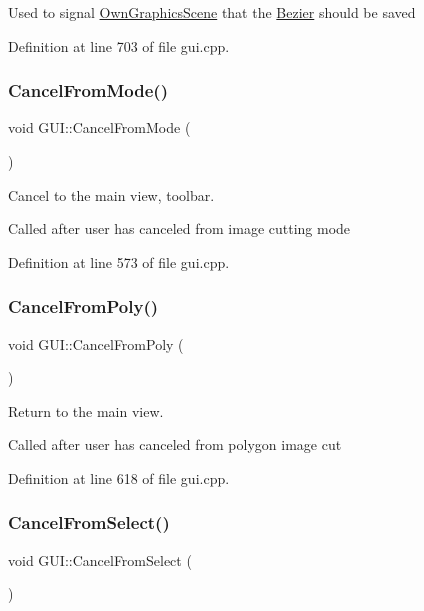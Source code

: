 Used to signal \mbox{\hyperlink{classOwnGraphicsScene}{Own\+Graphics\+Scene}} that the \mbox{\hyperlink{classBezier}{Bezier}} should be saved 

Definition at line 703 of file gui.\+cpp.

\mbox{\label{classGUI_a8188dd01b2dc9354afbbf2f4b18fd19a}} 
\subsubsection{\texorpdfstring{Cancel\+From\+Mode()}{CancelFromMode()}}
{\footnotesize\ttfamily void G\+U\+I\+::\+Cancel\+From\+Mode (\begin{DoxyParamCaption}{ }\end{DoxyParamCaption})}



Cancel to the main view, toolbar. 

Called after user has canceled from image cutting mode 

Definition at line 573 of file gui.\+cpp.

\mbox{\label{classGUI_a9f2b3abf533a7c720b817caed653da2e}} 
\subsubsection{\texorpdfstring{Cancel\+From\+Poly()}{CancelFromPoly()}}
{\footnotesize\ttfamily void G\+U\+I\+::\+Cancel\+From\+Poly (\begin{DoxyParamCaption}{ }\end{DoxyParamCaption})}



Return to the main view. 

Called after user has canceled from polygon image cut 

Definition at line 618 of file gui.\+cpp.

\mbox{\label{classGUI_a3e6d9c2c9482bf8cb9655899b36e8bc1}} 
\subsubsection{\texorpdfstring{Cancel\+From\+Select()}{CancelFromSelect()}}
{\footnotesize\ttfamily void G\+U\+I\+::\+Cancel\+From\+Select (\begin{DoxyParamCaption}{ }\end{DoxyParamCaption})}



